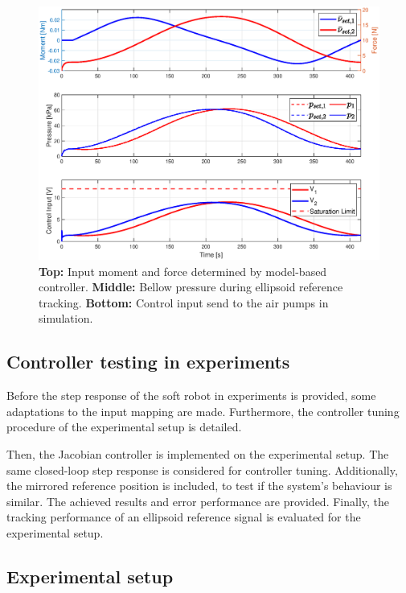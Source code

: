 \begin{figure}[H]
    \centering
    \includegraphics[width = \textwidth]{Figures/Chapter5/controlinputsimell.eps}
    \caption{\textbf{Top:} Input moment and force determined by model-based controller. \textbf{Middle:} Bellow pressure during ellipsoid reference tracking. \textbf{Bottom:} Control input send to the air pumps in simulation.}
    \label{fig5:controlinputellipssim}
\end{figure}



\subsection{Controller testing in experiments}



Before the step response of the soft robot in experiments is provided, some adaptations to the input mapping are made. Furthermore, the controller tuning procedure of the experimental setup is detailed. 



Then, the Jacobian controller is implemented on the experimental setup. The same closed-loop step response is considered for controller tuning. Additionally, the mirrored reference position is included, to test if the system's behaviour is similar. The achieved results and error performance are provided. Finally, the tracking performance of an ellipsoid reference signal is evaluated for the experimental setup. 



\subsection*{Experimental setup}

